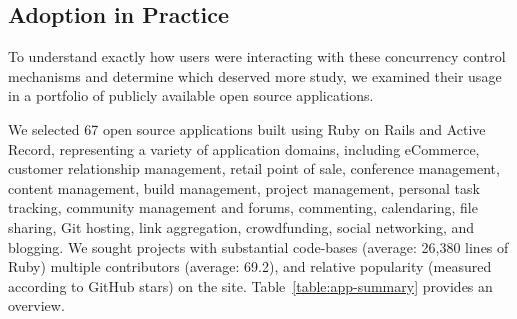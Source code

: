 \subsection{Adoption in Practice}

To understand exactly how users were interacting with these
concurrency control mechanisms and determine which deserved more
study, we examined their usage in a portfolio of publicly available
open source applications.

 We selected 67 open source applications
built using Ruby on Rails and Active Record, representing a variety of
application domains, including eCommerce, customer relationship
management, retail point of sale, conference management, content
management, build management, project management, personal task
tracking, community management and forums, commenting, calendaring,
file sharing, Git hosting, link aggregation, crowdfunding, social
networking, and blogging. We sought projects with substantial
code-bases (average: 26,380 lines of Ruby) multiple contributors
(average: 69.2), and relative popularity (measured according to GitHub
stars) on the site. Table~\ref{table:app-summary} provides an
overview.


